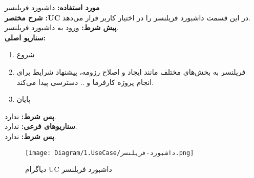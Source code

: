 \textbf{مورد استفاده:}
داشبورد فریلنسر
\\
\textbf{شرح مختصر :UC}
در این قسمت داشبورد فریلنسر را در اختیار کاربر قرار می‌دهد.
\\
\textbf{پيش شرط:}
ورود به داشبورد فریلنسر.
\\
\textbf{سناريو اصلی:}
\begin{enumerate}
	\item
	شروع
	\item
	فریلنسر به بخش‌های مختلف مانند ایجاد و اصلاح رزومه، پیشنهاد شرایط برای انجام پروژه کارفرما و .. دسترسی پیدا می‌کند.
	\item
	پایان
\end{enumerate}

\noindent
\textbf{پس شرط:}
ندارد.
\\
\textbf{سناريوهای فرعی:}
ندارد.
\\
\textbf{پس شرط:}
ندارد.


\begin{figure}[H]
	\centering
	\texttt{[image: Diagram/1.UseCase/داشبورد-فریلنسر.png]}
	\caption{دیاگرام UC داشبورد فریلنسر}
	\label{fig:uc:داشبورد-فریلنسر}
\end{figure}